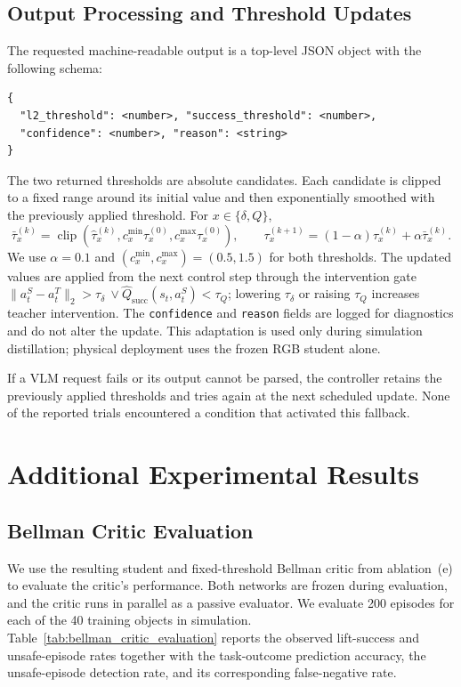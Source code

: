 \begin{samepage}
\subsection{Output Processing and Threshold Updates}
The requested machine-readable output is a top-level JSON object with the
following schema:
\begin{verbatim}
{
  "l2_threshold": <number>, "success_threshold": <number>,
  "confidence": <number>, "reason": <string>
}
\end{verbatim}
\end{samepage}
The two returned thresholds are absolute candidates. Each candidate is clipped
to a fixed range around its initial value and then exponentially smoothed with
the previously applied threshold. For $x\in\{\delta,Q\}$,
\[
\bar\tau_x^{(k)}=\operatorname{clip}\!\left(
\hat\tau_x^{(k)},c_x^{\min}\tau_x^{(0)},
c_x^{\max}\tau_x^{(0)}\right),\qquad
\tau_x^{(k+1)}=(1-\alpha)\tau_x^{(k)}+\alpha\bar\tau_x^{(k)}.
\]
We use $\alpha=0.1$ and $(c_x^{\min},c_x^{\max})=(0.5,1.5)$ for both
thresholds. The updated values are applied from the next control step through
the intervention gate
$\lVert a_t^S-a_t^T\rVert_2>\tau_\delta\ \lor
\hat Q_{\mathrm{succ}}(s_t,a_t^S)<\tau_Q$; lowering $\tau_\delta$ or raising
$\tau_Q$ increases teacher intervention. The \texttt{confidence} and
\texttt{reason} fields are logged for diagnostics and do not alter the update.
This adaptation is used only during simulation distillation; physical
deployment uses the frozen RGB student alone.

If a VLM request fails or its output cannot be parsed, the controller retains
the previously applied thresholds and tries again at the next scheduled update.
None of the reported trials encountered a condition that activated this
fallback.

\section{Additional Experimental Results}
\label{app:additional_experimental_results}

\subsection{Bellman Critic Evaluation}
We use the resulting student and fixed-threshold Bellman critic from
ablation~(e) to evaluate the critic's performance. Both networks are frozen
during evaluation, and the critic runs in parallel as a passive evaluator. We
evaluate 200 episodes for each of the 40 training objects in simulation.
Table~\ref{tab:bellman_critic_evaluation} reports the observed lift-success and
unsafe-episode rates together with the task-outcome prediction accuracy, the
unsafe-episode detection rate, and its corresponding false-negative rate.

